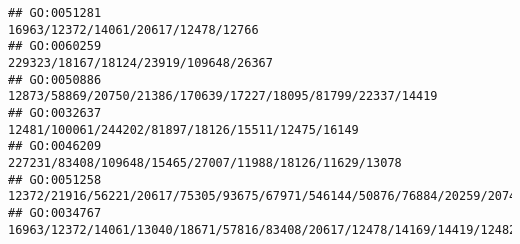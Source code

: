 \documentclass[
]{article}
\begin{document}
\begin{verbatim}
## GO:0051281                                                                                                                                                                                                                                                                                                                                                                          16963/12372/14061/20617/12478/12766
## GO:0060259                                                                                                                                                                                                                                                                                                                                                                        229323/18167/18124/23919/109648/26367
## GO:0050886                                                                                                                                                                                                                                                                                                                                                 12873/58869/20750/21386/170639/17227/18095/81799/22337/14419
## GO:0032637                                                                                                                                                                                                                                                                                                                                                            12481/100061/244202/81897/18126/15511/12475/16149
## GO:0046209                                                                                                                                                                                                                                                                                                                                                      227231/83408/109648/15465/27007/11988/18126/11629/13078
## GO:0051258                                                                                                                                                                                                                                                                                               12372/21916/56221/20617/75305/93675/67971/546144/50876/76884/20259/20741/15511/193740/11629/22153/225288/68166
## GO:0034767                                                                                                                                                                                                                                                                                                                                16963/12372/14061/13040/18671/57816/83408/20617/12478/14169/14419/12482/12766

\end{verbatim}
\end{document}
